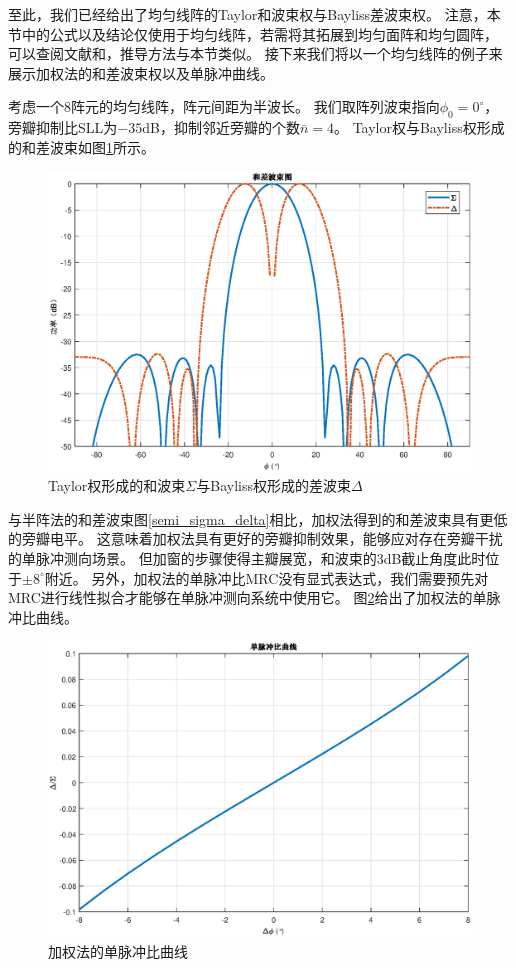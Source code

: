 \documentclass[master]{thesis-uestc}
\begin{document}
至此，我们已经给出了均匀线阵的Taylor和波束权与Bayliss差波束权。
注意，本节中的公式以及结论仅使用于均匀线阵，若需将其拓展到均匀面阵和均匀圆阵，
可以查阅文献\cite{Taylor}和\cite{Bayliss}，推导方法与本节类似。
接下来我们将以一个均匀线阵的例子来展示加权法的和差波束权以及单脉冲曲线。

考虑一个$8$阵元的均匀线阵，阵元间距为半波长。
我们取阵列波束指向$\phi_0=0^\circ$，旁瓣抑制比SLL为$-35$dB，抑制邻近旁瓣的个数$\bar{n}=4$。
Taylor权与Bayliss权形成的和差波束如图\ref{Taylor_Bayliss}所示。
\begin{figure}[h]
    \includegraphics[scale=0.5]{pic/Taylor_Bayliss.eps}
    \caption{Taylor权形成的和波束$\Sigma$与Bayliss权形成的差波束$\Delta$}
    \label{Taylor_Bayliss}
\end{figure}

与半阵法的和差波束图\ref{semi_sigma_delta}相比，加权法得到的和差波束具有更低的旁瓣电平。
这意味着加权法具有更好的旁瓣抑制效果，能够应对存在旁瓣干扰的单脉冲测向场景。
但加窗的步骤使得主瓣展宽，和波束的3dB截止角度此时位于$\pm8^\circ$附近。
另外，加权法的单脉冲比MRC没有显式表达式，我们需要预先对MRC进行线性拟合才能够在单脉冲测向系统中使用它。
图\ref{Taylor_Bayliss_MRC}给出了加权法的单脉冲比曲线。
\begin{figure}[h]
    \includegraphics[scale=0.5]{pic/Taylor_Bayliss_MRC.eps}
    \caption{加权法的单脉冲比曲线}
    \label{Taylor_Bayliss_MRC}
\end{figure}
\end{document}

